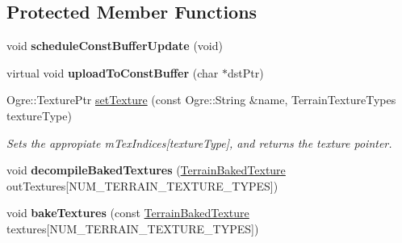 \subsection*{Protected Member Functions}
\begin{DoxyCompactItemize}
\item 
\mbox{\label{class_hlms_terrain_datablock_af7a1285a154f1cd2a99fd597644c001e}} 
void {\bfseries schedule\+Const\+Buffer\+Update} (void)
\item 
\mbox{\label{class_hlms_terrain_datablock_a45da4dc882095f2090d946c57d609940}} 
virtual void {\bfseries upload\+To\+Const\+Buffer} (char $\ast$dst\+Ptr)
\item 
\mbox{\label{class_hlms_terrain_datablock_aa579f6e6f919d9eeb4227751fb908257}} 
Ogre\+::\+Texture\+Ptr \hyperlink{class_hlms_terrain_datablock_aa579f6e6f919d9eeb4227751fb908257}{set\+Texture} (const Ogre\+::\+String \&name, Terrain\+Texture\+Types texture\+Type)
\begin{DoxyCompactList}\small\item\em Sets the appropiate m\+Tex\+Indices\mbox{[}texture\+Type\mbox{]}, and returns the texture pointer. \end{DoxyCompactList}\item 
\mbox{\label{class_hlms_terrain_datablock_a4959f9cd0ca5e098017d633f8fafd3f6}} 
void {\bfseries decompile\+Baked\+Textures} (\hyperlink{struct_terrain_baked_texture}{Terrain\+Baked\+Texture} out\+Textures\mbox{[}N\+U\+M\+\_\+\+T\+E\+R\+R\+A\+I\+N\+\_\+\+T\+E\+X\+T\+U\+R\+E\+\_\+\+T\+Y\+P\+ES\mbox{]})
\item 
\mbox{\label{class_hlms_terrain_datablock_a5ff1fc63d5778757e66985b5c4379fb2}} 
void {\bfseries bake\+Textures} (const \hyperlink{struct_terrain_baked_texture}{Terrain\+Baked\+Texture} textures\mbox{[}N\+U\+M\+\_\+\+T\+E\+R\+R\+A\+I\+N\+\_\+\+T\+E\+X\+T\+U\+R\+E\+\_\+\+T\+Y\+P\+ES\mbox{]})
\end{DoxyCompactItemize}
